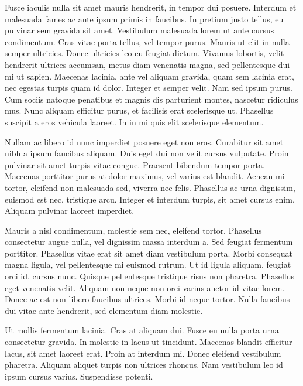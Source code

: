 \documentclass[11pt,]{article}
\begin{document}
Fusce iaculis nulla sit amet mauris hendrerit, in tempor dui posuere.
Interdum et malesuada fames ac ante ipsum primis in faucibus. In pretium
justo tellus, eu pulvinar sem gravida sit amet. Vestibulum malesuada
lorem ut ante cursus condimentum. Cras vitae porta tellus, vel tempor
purus. Mauris ut elit in nulla semper ultricies. Donec ultricies leo eu
feugiat dictum. Vivamus lobortis, velit hendrerit ultrices accumsan,
metus diam venenatis magna, sed pellentesque dui mi ut sapien. Maecenas
lacinia, ante vel aliquam gravida, quam sem lacinia erat, nec egestas
turpis quam id dolor. Integer et semper velit. Nam sed ipsum purus. Cum
sociis natoque penatibus et magnis dis parturient montes, nascetur
ridiculus mus. Nunc aliquam efficitur purus, et facilisis erat
scelerisque ut. Phasellus suscipit a eros vehicula laoreet. In in mi
quis elit scelerisque elementum.

Nullam ac libero id nunc imperdiet posuere eget non eros. Curabitur sit
amet nibh a ipsum faucibus aliquam. Duis eget dui non velit cursus
vulputate. Proin pulvinar sit amet turpis vitae congue. Praesent
bibendum tempor porta. Maecenas porttitor purus at dolor maximus, vel
varius est blandit. Aenean mi tortor, eleifend non malesuada sed,
viverra nec felis. Phasellus ac urna dignissim, euismod est nec,
tristique arcu. Integer et interdum turpis, sit amet cursus enim.
Aliquam pulvinar laoreet imperdiet.

Mauris a nisl condimentum, molestie sem nec, eleifend tortor. Phasellus
consectetur augue nulla, vel dignissim massa interdum a. Sed feugiat
fermentum porttitor. Phasellus vitae erat sit amet diam vestibulum
porta. Morbi consequat magna ligula, vel pellentesque mi euismod rutrum.
Ut id ligula aliquam, feugiat orci id, cursus nunc. Quisque pellentesque
tristique risus non pharetra. Phasellus eget venenatis velit. Aliquam
non neque non orci varius auctor id vitae lorem. Donec ac est non libero
faucibus ultrices. Morbi id neque tortor. Nulla faucibus dui vitae ante
hendrerit, sed elementum diam molestie.

Ut mollis fermentum lacinia. Cras at aliquam dui. Fusce eu nulla porta
urna consectetur gravida. In molestie in lacus ut tincidunt. Maecenas
blandit efficitur lacus, sit amet laoreet erat. Proin at interdum mi.
Donec eleifend vestibulum pharetra. Aliquam aliquet turpis non ultrices
rhoncus. Nam vestibulum leo id ipsum cursus varius. Suspendisse potenti.

\newpage


\end{document}
